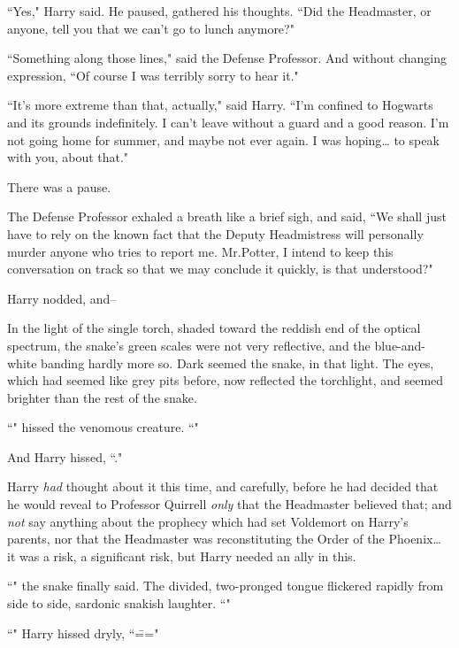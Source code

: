 ``Yes," Harry said. He paused, gathered his thoughts. ``Did the Headmaster, or anyone, tell you that we can't go to lunch anymore?"

``Something along those lines," said the Defense Professor. And without changing expression, ``Of course I was terribly sorry to hear it."

``It's more extreme than that, actually," said Harry. ``I'm confined to Hogwarts and its grounds indefinitely. I can't leave without a guard and a good reason. I'm not going home for summer, and maybe not ever again. I was hoping{\ldots} to speak with you, about that."

There was a pause.

The Defense Professor exhaled a breath like a brief sigh, and said, ``We shall just have to rely on the known fact that the Deputy Headmistress will personally murder anyone who tries to report me. Mr.\?Potter, I intend to keep this conversation on track so that we may conclude it quickly, is that understood?"

Harry nodded, and\---

In the light of the single torch, shaded toward the reddish end of the optical spectrum, the snake's green scales were not very reflective, and the blue-and-white banding hardly more so. Dark seemed the snake, in that light. The eyes, which had seemed like grey pits before, now reflected the torchlight, and seemed brighter than the rest of the snake.

``" hissed the venomous creature. ``"

And Harry hissed, ``."

Harry \emph{had} thought about it this time, and carefully, before he had decided that he would reveal to Professor Quirrell \emph{only} that the Headmaster believed that; and \emph{not} say anything about the prophecy which had set Voldemort on Harry's parents, nor that the Headmaster was reconstituting the Order of the Phoenix{\ldots} it was a risk, a significant risk, but Harry needed an ally in this.

``" the snake finally said. The divided, two-pronged tongue flickered rapidly from side to side, sardonic snakish laughter. ``"

``" Harry hissed dryly, ``\==="

